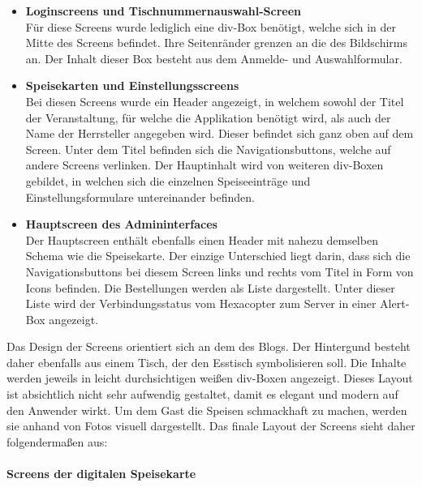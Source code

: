 \begin{itemize}
    \item \textbf{Loginscreens und Tischnummernauswahl-Screen}\\
Für diese Screens wurde lediglich eine div-Box benötigt, welche sich in der Mitte des Screens befindet. Ihre Seitenränder grenzen an die des Bildschirms an. Der Inhalt dieser Box besteht aus dem Anmelde- und Auswahlformular.
	\item \textbf{Speisekarten und Einstellungsscreens}\\
Bei diesen Screens wurde ein Header angezeigt, in welchem sowohl der Titel der Veranstaltung, für welche die Applikation benötigt wird, als auch der Name der Herrsteller angegeben wird. Dieser befindet sich ganz oben auf dem Screen. Unter dem Titel befinden sich die Navigationsbuttons, welche auf andere Screens verlinken. Der Hauptinhalt wird von weiteren div-Boxen gebildet, in welchen sich die einzelnen Speiseeinträge und Einstellungsformulare untereinander befinden.
    \item \textbf{Hauptscreen des Admininterfaces}\\
Der Hauptscreen enthält ebenfalls einen Header mit nahezu demselben Schema wie die Speisekarte. Der einzige Unterschied liegt darin, dass sich die Navigationsbuttons bei diesem Screen links und rechts vom Titel in Form von Icons befinden. Die Bestellungen werden als Liste dargestellt. Unter dieser Liste wird der Verbindungsstatus vom Hexacopter zum Server in einer Alert-Box angezeigt.
  \end{itemize}
Das Design der Screens orientiert sich an dem des Blogs. Der Hintergund besteht daher ebenfalls aus einem Tisch, der den Esstisch symbolisieren soll. Die Inhalte werden jeweils in leicht durchsichtigen weißen div-Boxen angezeigt. Dieses Layout ist absichtlich nicht sehr aufwendig gestaltet, damit es elegant und modern auf den Anwender wirkt.
Um dem Gast die Speisen schmackhaft zu machen, werden sie anhand von Fotos visuell dargestellt.
Das finale Layout der Screens sieht daher folgendermaßen aus:\\
\\
\textbf{Screens der digitalen Speisekarte}
